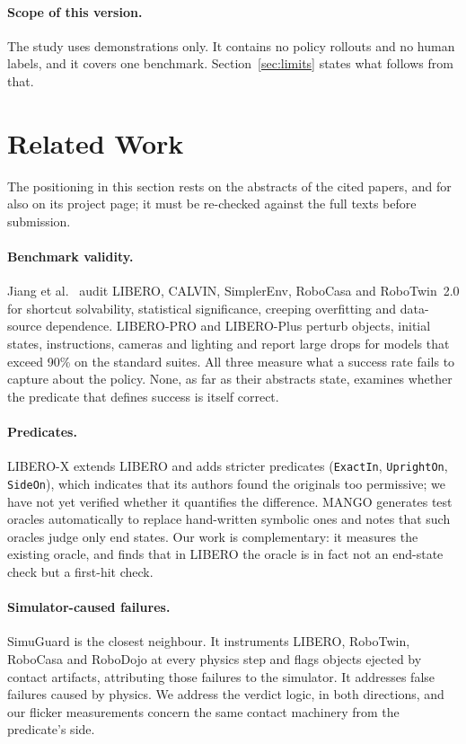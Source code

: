 \documentclass[10pt,twocolumn]{article}
\newcommand{\pred}[1]{\texttt{#1}}
\begin{document}
\paragraph{Scope of this version.} The study uses demonstrations only. It contains no policy rollouts and no human labels, and it covers one benchmark. Section~\ref{sec:limits} states what follows from that.

\section{Related Work}

The positioning in this section rests on the abstracts of the cited papers, and for \cite{jiang2026benchmarking} also on its project page; it must be re-checked against the full texts before submission.

\paragraph{Benchmark validity.} Jiang et al.\ \cite{jiang2026benchmarking} audit LIBERO, CALVIN, SimplerEnv, RoboCasa \cite{nasiriany2024robocasa} and RoboTwin~2.0 for shortcut solvability, statistical significance, creeping overfitting and data-source dependence. LIBERO-PRO \cite{zhou2025liberopro} and LIBERO-Plus \cite{fei2025liberoplus} perturb objects, initial states, instructions, cameras and lighting and report large drops for models that exceed 90\% on the standard suites. All three measure what a success rate fails to capture about the policy. None, as far as their abstracts state, examines whether the predicate that defines success is itself correct.

\paragraph{Predicates.} LIBERO-X \cite{wang2026liberox} extends LIBERO and adds stricter predicates (\pred{ExactIn}, \pred{UprightOn}, \pred{SideOn}), which indicates that its authors found the originals too permissive; we have not yet verified whether it quantifies the difference. MANGO \cite{valle2026mango} generates test oracles automatically to replace hand-written symbolic ones and notes that such oracles judge only end states. Our work is complementary: it measures the existing oracle, and finds that in LIBERO the oracle is in fact not an end-state check but a first-hit check.

\paragraph{Simulator-caused failures.} SimuGuard \cite{zhou2026simuguard} is the closest neighbour. It instruments LIBERO, RoboTwin, RoboCasa and RoboDojo at every physics step and flags objects ejected by contact artifacts, attributing those failures to the simulator. It addresses false failures caused by physics. We address the verdict logic, in both directions, and our flicker measurements concern the same contact machinery from the predicate's side.
\end{document}
